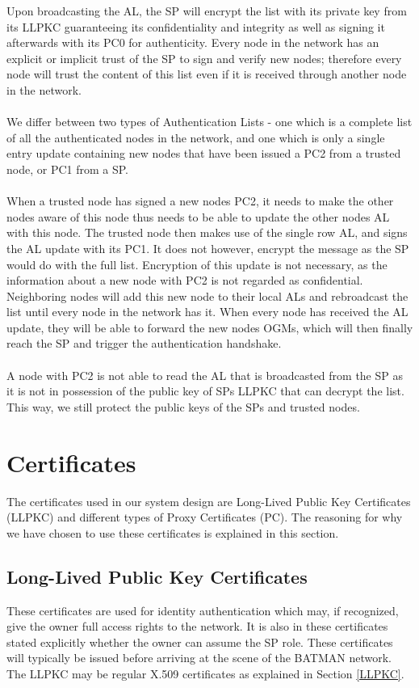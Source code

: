 \noindent
Upon broadcasting the AL, the SP will encrypt the list with its private key from its LLPKC guaranteeing its confidentiality and integrity as well as signing it afterwards with its PC0 for authenticity. Every node in the network has an explicit or implicit trust of the SP to sign and verify new nodes; therefore every node will trust the content of this list even if it is received through another node in the network.
\\\\
We differ between two types of Authentication Lists - one which is a complete list of all the authenticated nodes in the network, and one which is only a single entry update containing new nodes that have been issued a PC2 from a trusted node, or PC1 from a SP.
\\\\
When a trusted node has signed a new nodes PC2, it needs to make the other nodes aware of this node thus needs to be able to update the other nodes AL with this node. The trusted node then makes use of the single row AL, and signs the AL update with its PC1. It does not however, encrypt the message as the SP would do with the full list. Encryption of this update is not necessary, as the information about a new node with PC2 is not regarded as confidential. Neighboring nodes will add this new node to their local ALs and rebroadcast the list until every node in the network has it. When every node has received the AL update, they will be able to forward the new nodes OGMs, which will then finally reach the SP and trigger the authentication handshake.
\\\\
A node with PC2 is not able to read the AL that is broadcasted from the SP as it is not in possession of the public key of SPs LLPKC that can decrypt the list. This way, we still protect the public keys of the SPs and trusted nodes.

\section{Certificates} \label{system_certificates}
The certificates used in our system design are Long-Lived Public Key Certificates (LLPKC) and different types of Proxy Certificates (PC). The reasoning for why we have chosen to use these certificates is explained in this section.

\subsection{Long-Lived Public Key Certificates}
These certificates are used for identity authentication which may, if recognized, give the owner full access rights to the network. It is also in these certificates stated explicitly whether the owner can assume the SP role. These certificates will typically be issued before arriving at the scene of the BATMAN network. The LLPKC may be regular X.509 certificates as explained in Section \ref{LLPKC}.

